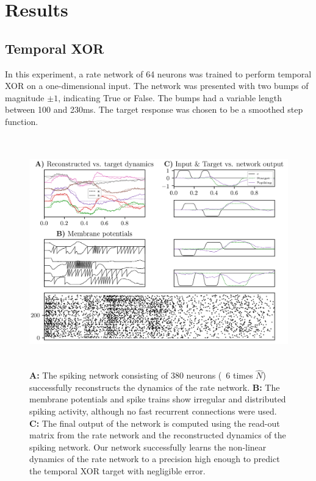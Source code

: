 \documentclass[twoside,11pt,titlepage]{article}
\begin{document}
\section{Results}

\subsection{Temporal XOR}
In this experiment, a rate network of 64 neurons was trained to perform
temporal XOR on a one-dimensional input. The network was presented with two bumps
of magnitude $\pm 1$, indicating True or False. The bumps had a variable length
between 100 and 230ms. The target response was chosen to be a smoothed step function. 

\begin{figure}[!htb]
  \includegraphics[width = \columnwidth, height=10cm]{figures/figure2.png}
  \caption{\textbf{A:} The spiking network consisting
  of 380 neurons (~6 times $\hat{N}$) successfully reconstructs the dynamics of the rate network.
  \textbf{B:} The membrane potentials and spike trains show
  irregular and distributed spiking activity, although no fast recurrent connections were used.
  \textbf{C:} The final output of the network is computed using the read-out matrix from the
  rate network and the reconstructed dynamics of the spiking network. Our network successfully
  learns the non-linear dynamics of the rate network to a precision high enough to predict the
  temporal XOR target with negligible error.}
  \label{fig:figure2}
\end{figure}
\end{document}
